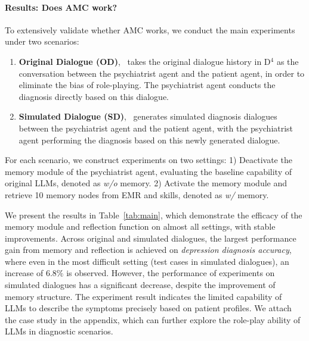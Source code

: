 \paragraph{Results: Does AMC work?}
To extensively validate whether AMC works, we conduct the main experiments under two scenarios:
\begin{enumerate}
    \item \textbf{Original Dialogue (OD)}, \system~takes the original dialogue history in D$^4$ as the conversation between the psychiatrist agent and the patient agent, in order to eliminate the bias of role-playing. The psychiatrist agent conducts the diagnosis directly based on this dialogue. %
    \item \textbf{Simulated Dialogue (SD)}, \system~generates simulated diagnosis dialogues between the psychiatrist agent and the patient agent, with the psychiatrist agent performing the diagnosis based on this newly generated dialogue. 
\end{enumerate} 

For each scenario, we construct experiments on two settings: 1) Deactivate the memory module of the psychiatrist agent, evaluating the baseline capability of original LLMs, denoted as \textit{w/o} memory. 2) Activate the memory module and retrieve 10 memory nodes from EMR and skills, denoted as \textit{w/} memory. %


We present the results in Table~\ref{tab:main}, which demonstrate the efficacy of the memory module and reflection function on almost all settings, with stable improvements. Across original and simulated dialogues, the largest performance gain from memory and reflection is achieved on \textit{depression diagnosis accuracy}, where even in the most difficult setting (test cases in simulated dialogues), an increase of $6.8\%$ is observed. However, the performance of experiments on simulated dialogues has a significant decrease, despite the improvement of memory structure. The experiment result indicates the limited capability of LLMs to describe the symptoms precisely based on patient profiles. We attach the case study in the appendix, which can further explore the role-play ability of LLMs in diagnostic scenarios.

